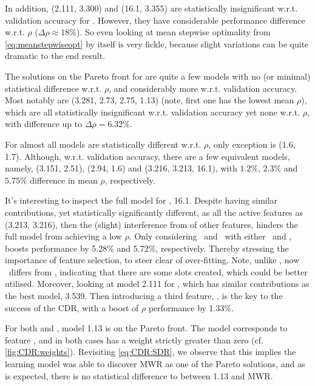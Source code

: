 In addition, (2.111, 3.300) and (16.1, 3.355) are statistically insignificant 
w.r.t. validation accuracy for . However, they have considerable 
performance difference w.r.t. $\rho$ ($\Delta\rho \approx 18\%$). 
So even looking at mean stepwise optimality from \cref{eq:meanstepwiseopt} by 
itself is very fickle, because slight variations can be quite dramatic to the 
end result. 

The solutions on the Pareto front for  are quite a few models
with no (or minimal) statistical difference w.r.t. $\rho$, and 
considerably more w.r.t. validation accuracy. 
Most notably are (3.281, 2.73, 2.75, 1.13)
(note, first one has the lowest mean $\rho$), which are all statistically 
insignificant w.r.t. validation accuracy yet none w.r.t. $\rho$, with 
difference up to $\Delta\rho=6.32\%$.

For  almost all models are statistically different w.r.t. $\rho$, 
only exception is (1.6, 1.7).
Although, w.r.t. validation accuracy, there are a few equivalent models, 
namely, (3.151, 2.51), (2.94, 1.6) and (3.216, 3.213, 16.1), with $1.2\%$, 
$2.3\%$ and $5.75\%$ difference in mean $\rho$, respectively. 

It's interesting to inspect the full model for , 16.1. 
Despite having similar contributions, yet statistically significantly 
different, as all the active features as (3.213, 3.216), then the (slight) 
interference from of other features, hinders the full model from achieving a 
low $\rho$. 
Only considering \phijobOps\ and \phimacOps\ with either \phiendTime\ and 
\phimacFree, boosts performance by 5.28\% and 5.72\%, respectively. 
Thereby stressing the importance of feature selection, to steer clear of 
over-fitting. Note, unlike , now \phiendTime\ differs from 
\phimacFree, indicating that there are some slots created, which could be 
better utilised.
Moreover, looking at model 2.111 for , which has similar 
contributions as the best model, 3.539. Then introducing a third feature, 
\phimacWrm, is the key to the success of the CDR, with a boost of $\rho$ 
performance by 1.33\%. 

For both  and , model 1.13 is on the Pareto 
front. The model corresponds to feature \phijobWrm, and in both cases has a 
weight strictly greater than zero (cf. \cref{fig:CDR:weights}). Revisiting 
\cref{eq:CDR:SDR}, we observe that this implies the learning 
model was able to discover MWR as one of the Pareto solutions, and as is 
expected, there is no statistical difference to between 1.13 and MWR.

